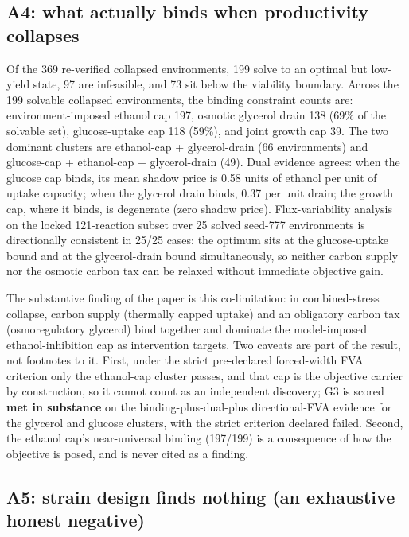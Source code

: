 \documentclass[12pt]{article}
\begin{document}
\subsection{A4: what actually binds when productivity collapses}
\label{sec:a4}

Of the 369 re-verified collapsed environments, 199 solve to an optimal
but low-yield state, 97 are infeasible, and 73 sit below the viability
boundary. Across the 199 solvable collapsed environments, the binding
constraint counts are: environment-imposed ethanol cap 197, osmotic
glycerol drain 138 (69\% of the solvable set), glucose-uptake cap 118
(59\%), and joint growth cap 39. The two dominant clusters are
ethanol-cap + glycerol-drain (66 environments) and glucose-cap +
ethanol-cap + glycerol-drain (49). Dual evidence agrees: when the
glucose cap binds, its mean shadow price is 0.58 units of ethanol per
unit of uptake capacity; when the glycerol drain binds, 0.37 per unit
drain; the growth cap, where it binds, is degenerate (zero shadow
price). Flux-variability analysis on the locked 121-reaction subset
over 25 solved seed-777 environments is directionally consistent in
25/25 cases: the optimum sits at the glucose-uptake bound and at the
glycerol-drain bound simultaneously, so neither carbon supply nor the
osmotic carbon tax can be relaxed without immediate objective gain.

The substantive finding of the paper is this co-limitation: in
combined-stress collapse, carbon supply (thermally capped uptake) and
an obligatory carbon tax (osmoregulatory glycerol) bind together and
dominate the model-imposed ethanol-inhibition cap as intervention
targets. Two caveats are part of the result, not footnotes to it.
First, under the strict pre-declared forced-width FVA criterion only
the ethanol-cap cluster passes, and that cap is the objective carrier
by construction, so it cannot count as an independent discovery; G3
is scored \textbf{met in substance} on the binding-plus-dual-plus
directional-FVA evidence for the glycerol and glucose clusters, with
the strict criterion declared failed. Second, the ethanol cap's
near-universal binding (197/199) is a consequence of how the
objective is posed, and is never cited as a finding.

\subsection{A5: strain design finds nothing (an exhaustive honest negative)}
\label{sec:a5}
\end{document}
